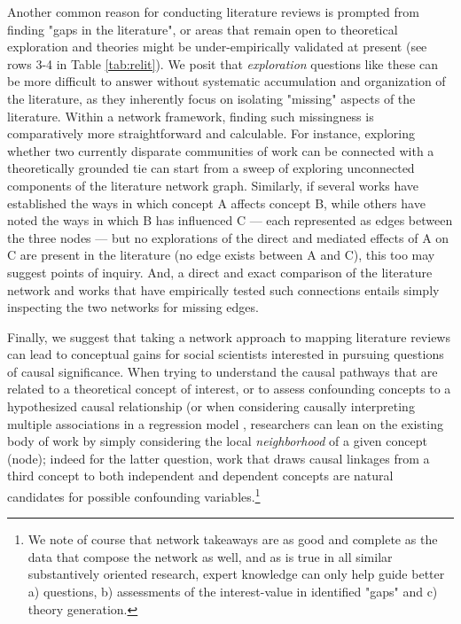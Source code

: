 \documentclass{cup-pan}
\begin{document}
Another common reason for conducting literature reviews is prompted from finding "gaps in the literature", or areas that remain open to theoretical exploration and theories might be under-empirically validated at present (see rows 3-4 in Table \ref{tab:relit}). We posit that \textit{exploration} questions like these can be more difficult to answer without systematic accumulation and organization of the literature, as they inherently focus on isolating "missing" aspects of the literature. Within a network framework, finding such missingness is comparatively more straightforward and calculable. For instance, exploring whether two currently disparate communities of work can be connected with a theoretically grounded tie can start from a sweep of exploring unconnected components of the literature network graph. Similarly, if several works have established the ways in which concept A affects concept B, while others have noted the ways in which B has influenced C --- each represented as edges between the three nodes --- but no explorations of the direct and mediated effects of A on C are present in the literature (no edge exists between A and C), this too may suggest points of inquiry. And, a direct and exact comparison of the literature network and works that have empirically tested such connections entails simply inspecting the two networks for missing edges.\par 

Finally, we suggest that taking a network approach to mapping literature reviews can lead to conceptual gains for social scientists interested in pursuing questions of causal significance. When trying to understand the causal pathways that are related to a theoretical concept of interest, or to assess confounding concepts to a hypothesized causal relationship (or when considering causally interpreting multiple associations in a regression model \citep{keele_causal_2020}, researchers can lean on the existing body of work by simply considering the local \textit{neighborhood} of a given concept (node); indeed for the latter question, work that draws causal linkages from a third concept to both independent and dependent concepts are natural candidates for possible confounding variables.\footnote{We note of course that network takeaways are as good and complete as the data that compose the network as well, and as is true in all similar substantively oriented research, expert knowledge can only help guide better a) questions, b) assessments of the interest-value in identified "gaps" and c) theory generation.}\par
\end{document}
